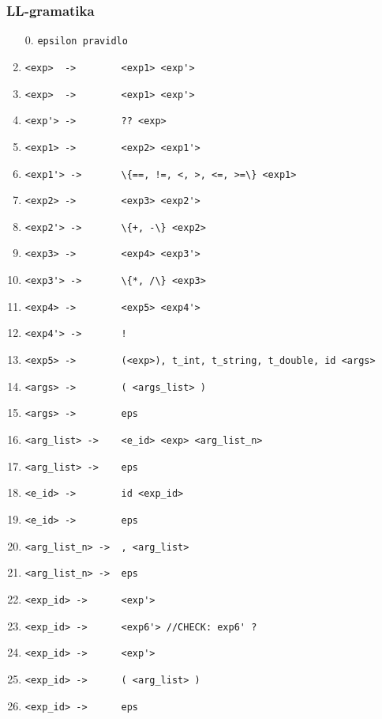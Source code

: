 \documentclass[12pt]{article}
\begin{document}
\subsubsection{LL-gramatika}
        \begin{enumerate}[noitemsep]
            \item[0.] \verb |epsilon pravidlo| 
            \item \verb|<exp>  ->        <exp1> <exp'>|
            \item \verb|<exp>  ->        <exp1> <exp'>|
            \item \verb|<exp'> ->        ?? <exp>|
            \item \verb|<exp1> ->        <exp2> <exp1'>|
            \item \verb|<exp1'> ->       \{==, !=, <, >, <=, >=\} <exp1>|
            \item \verb|<exp2> ->        <exp3> <exp2'>|
            \item \verb|<exp2'> ->       \{+, -\} <exp2>|
            \item \verb|<exp3> ->        <exp4> <exp3'>|
            \item \verb|<exp3'> ->       \{*, /\} <exp3>|
            \item \verb|<exp4> ->        <exp5> <exp4'>|
            \item \verb|<exp4'> ->       !|
            \item \verb|<exp5> ->        (<exp>), t_int, t_string, t_double, id <args>|
    
            \item \verb|<args> ->        ( <args_list> )|
            \item \verb|<args> ->        eps|
            \item \verb|<arg_list> ->    <e_id> <exp> <arg_list_n>|
            \item \verb|<arg_list> ->    eps|
            \item \verb|<e_id> ->        id <exp_id>|
            \item \verb|<e_id> ->        eps|
            \item \verb|<arg_list_n> ->  , <arg_list>|
            \item \verb|<arg_list_n> ->  eps|
            \item \verb|<exp_id> ->      <exp'>|
            \item \verb|<exp_id> ->      <exp6'> //CHECK: exp6' ?|
            \item \verb|<exp_id> ->      <exp'>|
            \item \verb|<exp_id> ->      ( <arg_list> )|
            \item \verb|<exp_id> ->      eps|
    

\end{enumerate}
\end{document}
